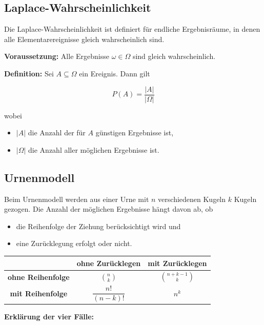 \documentclass[a4paper]{article}
\begin{document}
\subsection{Laplace-Wahrscheinlichkeit}

Die Laplace-Wahrscheinlichkeit ist definiert für endliche Ergebnisräume, in denen alle Elementarereignisse gleich wahrscheinlich sind.

\textbf{Voraussetzung:}  
Alle Ergebnisse $\omega \in \Omega$ sind gleich wahrscheinlich.

\textbf{Definition:}  
Sei $A \subseteq \Omega$ ein Ereignis. Dann gilt

\[
P(A) = \frac{|A|}{|\Omega|}
\]

wobei
\begin{itemize}
    \item $|A|$ die Anzahl der für $A$ günstigen Ergebnisse ist,
    \item $|\Omega|$ die Anzahl aller möglichen Ergebnisse ist.
\end{itemize}

\subsection{Urnenmodell}

Beim Urnenmodell werden aus einer Urne mit $n$ verschiedenen Kugeln $k$ Kugeln gezogen.  
Die Anzahl der möglichen Ergebnisse hängt davon ab, ob

\begin{itemize}
    \item die Reihenfolge der Ziehung berücksichtigt wird und
    \item eine Zurücklegung erfolgt oder nicht.
\end{itemize}

\begin{center}
\begin{tabular}{c|c|c}
 & \textbf{ohne Zurücklegen} & \textbf{mit Zurücklegen} \\
\hline
\textbf{ohne Reihenfolge} &
$\binom{n}{k}$ &
$\binom{n+k-1}{k}$  \\
\hline
\textbf{mit Reihenfolge} &
$\dfrac{n!}{(n-k)!}$ &
$n^k$ \\
\end{tabular}
\end{center}

\textbf{Erklärung der vier Fälle:}
\end{document}
